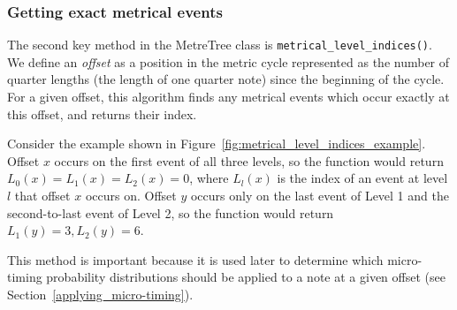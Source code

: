 \documentclass[12pt,twoside,openright]{report}
\begin{document}
\subsubsection{Getting exact metrical events} \label{metrical_level_indices}

The second key method in the MetreTree class is \verb'metrical_level_indices()'. We define an \emph{offset} as a position in the metric cycle represented as the number of quarter lengths (the length of one quarter note) since the beginning of the cycle. For a
given offset, this algorithm finds any metrical events
which occur exactly at this offset, and returns their index.

Consider the example shown in Figure~\ref{fig:metrical_level_indices_example}. Offset $x$
occurs on the first event of all three levels, so the function would return $L_0(x)=L_1(x)=L_2(x)=0$, where $L_l(x)$ is the index of an event at level $l$ that offset $x$ occurs on. Offset $y$ occurs only on the last event of Level 1 and the second-to-last event of Level 2, so the function would return $L_1(y)=3, L_2(y)=6$.

This method is important because it
is used later to determine which micro-timing probability distributions should
be applied to a note at a given offset (see Section~\ref{applying_micro-timing}).
\end{document}
